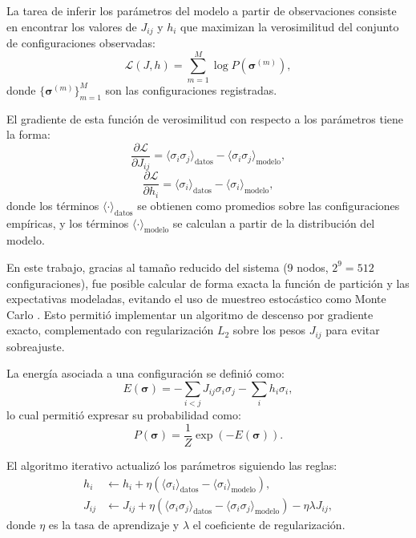 La tarea de inferir los parámetros del modelo a partir de 
observaciones consiste en encontrar los valores de \( J_{ij} \) 
y \( h_i \) que maximizan la verosimilitud del conjunto de 
configuraciones observadas:
\[
\mathcal{L}(J, h) = \sum_{m=1}^{M} \log P(\boldsymbol{\sigma}^{(m)}),
\]
donde \( \{\boldsymbol{\sigma}^{(m)}\}_{m=1}^M \) son las 
configuraciones registradas.

El gradiente de esta función de verosimilitud con respecto a los 
parámetros tiene la forma:
\[
\frac{\partial \mathcal{L}}{\partial J_{ij}} = \langle \sigma_i \sigma_j \rangle_{\text{datos}} - \langle \sigma_i \sigma_j \rangle_{\text{modelo}},
\]
\[
\frac{\partial \mathcal{L}}{\partial h_i} = \langle \sigma_i \rangle_{\text{datos}} - \langle \sigma_i \rangle_{\text{modelo}},
\]
donde los términos \( \langle \cdot \rangle_{\text{datos}} \) se 
obtienen como promedios sobre las configuraciones empíricas, y 
los términos \( \langle \cdot \rangle_{\text{modelo}} \) se 
calculan a partir de la distribución del modelo.

En este trabajo, gracias al tamaño reducido del sistema (9 
nodos, \(2^9 = 512\) configuraciones), fue posible calcular de 
forma exacta la función de partición y las expectativas 
modeladas, evitando el uso de muestreo estocástico como Monte 
Carlo \cite{pena2001deduccion}. Esto permitió implementar un algoritmo de descenso por 
gradiente exacto, complementado con regularización \(L_2\) sobre 
los pesos \( J_{ij} \) para evitar sobreajuste.

La energía asociada a una configuración se definió como:
\[
E(\boldsymbol{\sigma}) = -\sum_{i<j} J_{ij} \sigma_i \sigma_j - \sum_i h_i \sigma_i,
\]
lo cual permitió expresar su probabilidad como:
\[
P(\boldsymbol{\sigma}) = \frac{1}{Z} \exp\left(-E(\boldsymbol{\sigma})\right).
\]

El algoritmo iterativo actualizó los parámetros siguiendo las 
reglas:
\begin{align}
    h_i &\leftarrow h_i + \eta \left( \langle \sigma_i \rangle_{\text{datos}} - \langle \sigma_i \rangle_{\text{modelo}} \right), \\
    J_{ij} &\leftarrow J_{ij} + \eta \left( \langle \sigma_i \sigma_j \rangle_{\text{datos}} - \langle \sigma_i \sigma_j \rangle_{\text{modelo}} \right) - \eta \lambda J_{ij},
\end{align}
donde \( \eta \) es la tasa de aprendizaje y \( \lambda \) el 
coeficiente de regularización.

